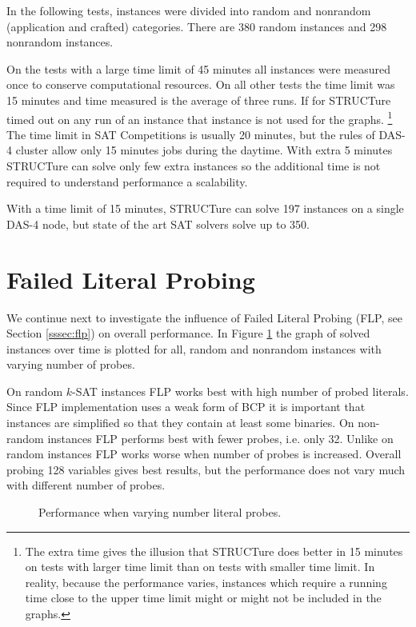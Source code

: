 In the following tests, instances were divided into random and
nonrandom (application and crafted) categories. There are 380 random
instances and 298 nonrandom instances.

On the tests with a large time limit of 45 minutes all instances were
measured once to conserve computational resources. On all other tests
the time limit was 15 minutes and time measured is the average of
three runs.  If for STRUCTure timed out on any run of an instance
that instance is not used for the graphs.  \footnote{The extra
time gives the illusion that STRUCTure does better in 15 minutes on
tests with larger time limit than on tests with smaller time limit.
In reality, because the performance varies, instances which require
a running time close to the upper time limit might or might not
be included in the graphs.} The time limit in SAT Competitions is
usually 20 minutes, but the rules of DAS-4 cluster allow only 15
minutes jobs during the daytime.  With extra 5 minutes STRUCTure
can solve only few extra instances so the additional time is not
required to understand performance a scalability.

With a time limit of 15 minutes, STRUCTure can solve 197 instances
on a single DAS-4 node, but state of the art SAT solvers solve up
to 350.


\section{Failed Literal Probing}

We continue next to investigate the influence of Failed
Literal Probing (FLP, see Section \ref{sssec:flp}) on overall
performance. In Figure \ref{fig:flp} the graph of solved instances
over time is plotted for all, random and nonrandom instances with
varying number of probes.

On random $k$-SAT instances FLP works best with high number of
probed literals. Since FLP implementation uses a weak form of BCP
it is important that instances are simplified so that they contain
at least some binaries.  On non-random instances FLP performs best
with fewer probes, i.e. only 32.  Unlike on random instances FLP
works worse when number of probes is increased.  Overall probing
128 variables gives best results, but the performance does not vary
much with different number of probes.

\begin{figure}
  \centering
  \caption{Performance when varying number literal probes.}
  \label{fig:flp}
\end{figure}


